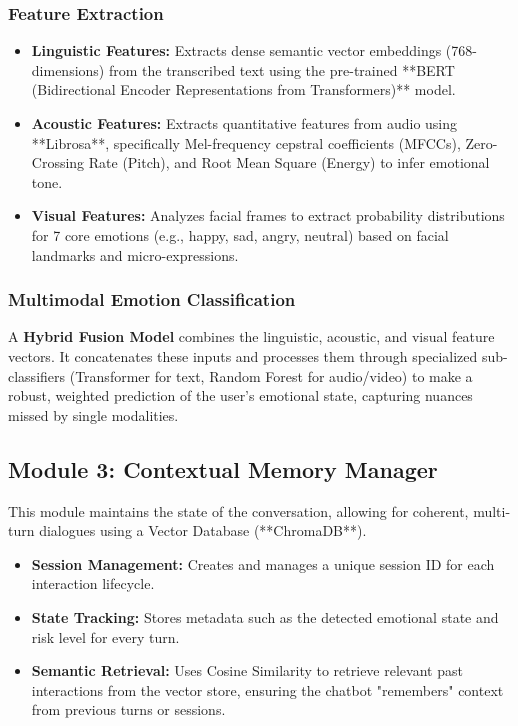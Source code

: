 \subsubsection{Feature Extraction}
\begin{itemize}
    \item \textbf{Linguistic Features:} Extracts dense semantic vector embeddings (768-dimensions) from the transcribed text using the pre-trained **BERT (Bidirectional Encoder Representations from Transformers)** model.
    \item \textbf{Acoustic Features:} Extracts quantitative features from audio using **Librosa**, specifically Mel-frequency cepstral coefficients (MFCCs), Zero-Crossing Rate (Pitch), and Root Mean Square (Energy) to infer emotional tone.
    \item \textbf{Visual Features:} Analyzes facial frames to extract probability distributions for 7 core emotions (e.g., happy, sad, angry, neutral) based on facial landmarks and micro-expressions.
\end{itemize}

\subsubsection{Multimodal Emotion Classification}
A \textbf{Hybrid Fusion Model} combines the linguistic, acoustic, and visual feature vectors. It concatenates these inputs and processes them through specialized sub-classifiers (Transformer for text, Random Forest for audio/video) to make a robust, weighted prediction of the user's emotional state, capturing nuances missed by single modalities.

\subsection{Module 3: Contextual Memory Manager}
This module maintains the state of the conversation, allowing for coherent, multi-turn dialogues using a Vector Database (**ChromaDB**).
\begin{itemize}
    \item \textbf{Session Management:} Creates and manages a unique session ID for each interaction lifecycle.
    \item \textbf{State Tracking:} Stores metadata such as the detected emotional state and risk level for every turn.
    \item \textbf{Semantic Retrieval:} Uses Cosine Similarity to retrieve relevant past interactions from the vector store, ensuring the chatbot "remembers" context from previous turns or sessions.
\end{itemize}

